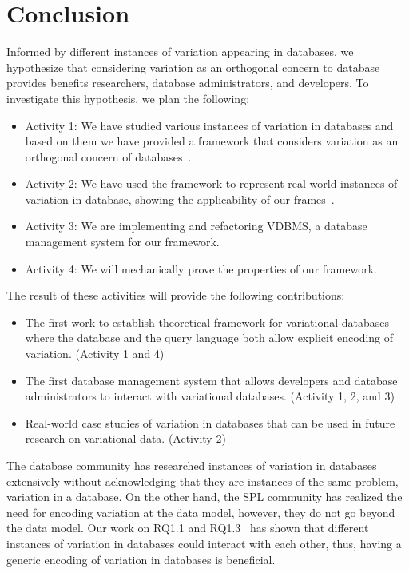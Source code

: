 \section{Conclusion}
\label{sec:con}

Informed by different instances of variation appearing in databases, we hypothesize that considering 
variation as an orthogonal concern to database provides benefits researchers, database administrators, and developers.
To investigate this hypothesis, we plan the following:

\begin{itemize}
\item Activity 1: We have studied various instances of variation in databases and based on them
we have provided a framework that considers variation as an orthogonal concern of databases~\cite{ATW17dbpl,ATW18poly}.
\item Activity 2: We have used the framework to represent real-world instances of variation in database,
showing the applicability of our frames~\cite{ALW21vamos}.
\item Activity 3: We are implementing and refactoring VDBMS, a database management system for our
framework.
\item Activity 4: We will mechanically prove the properties of our framework.
\end{itemize}

\noindent
The result of these activities will provide the following contributions:

\begin{itemize}
\item The first work to establish theoretical framework for variational databases where the database and the query language both 
allow explicit encoding of variation. (Activity 1 and 4)
\item The first database management system that allows developers and database administrators to interact with variational databases. (Activity 1, 2, and 3)
\item Real-world case studies of variation in databases that can be used in future research on variational data. (Activity 2)
\end{itemize}

The database community has researched instances of variation in databases extensively without 
acknowledging that they are instances of the same problem, variation in a database. On the other
hand, the SPL community has realized the need for encoding variation at the data model, however,
they do not go beyond the data model. Our work on RQ1.1 and RQ1.3~\cite{ALW21vamos} has
shown that different instances of variation in databases could interact with each other, thus, 
having a generic encoding of variation in databases is beneficial. 